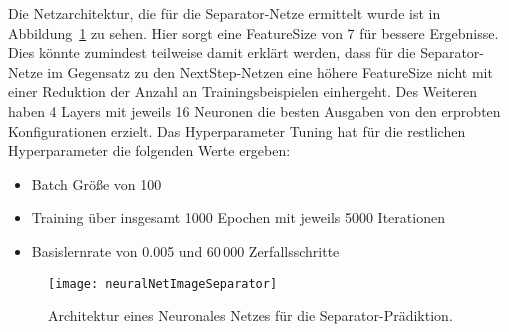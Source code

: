 Die Netzarchitektur, die für die Separator-Netze  ermittelt wurde ist in Abbildung~\ref{fig:netArchitectureSep} zu sehen.
Hier sorgt eine FeatureSize von 7 für bessere Ergebnisse.
Dies könnte zumindest teilweise damit erklärt werden, dass für die Separator-Netze im Gegensatz zu den NextStep-Netzen eine höhere FeatureSize nicht mit einer Reduktion der Anzahl an Trainingsbeispielen einhergeht.
Des Weiteren haben 4 Layers mit jeweils 16 Neuronen die besten Ausgaben von den erprobten Konfigurationen erzielt.
Das Hyperparameter Tuning hat für die restlichen Hyperparameter die folgenden Werte ergeben:
\begin{itemize}
    \item Batch Größe von 100
    \item Training über insgesamt 1000 Epochen mit jeweils 5000 Iterationen
    \item Basislernrate von 0.005 und 60\,000 Zerfallsschritte
\end{itemize}

% 

\begin{figure}[h]
    \centering
	\texttt{[image: neuralNetImageSeparator]}
	\caption{Architektur eines Neuronales Netzes für die Separator-Prädiktion.}
	\label{fig:netArchitectureSep}
\end{figure}


